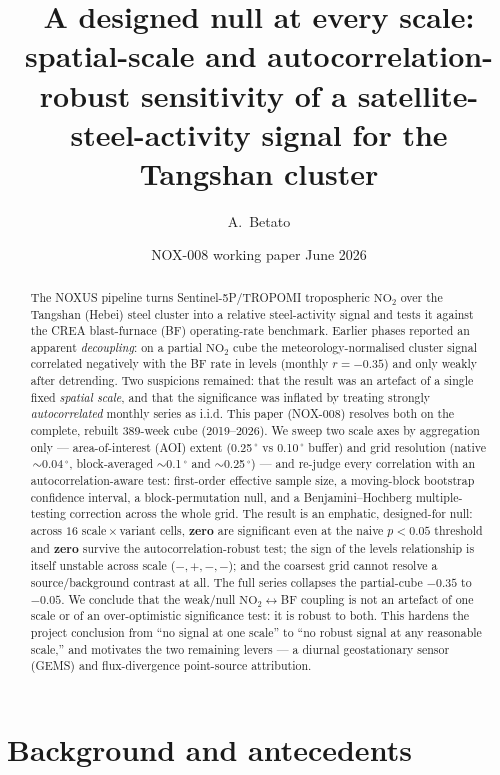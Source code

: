 \documentclass[11pt,a4paper]{article}
\title{\bfseries A designed null at every scale: spatial-scale and
autocorrelation-robust sensitivity of a satellite-\ce{NO_2} steel-activity signal
for the Tangshan cluster}
\author[1]{A.~Betato}
\affil[1]{NOXUS project --- \texttt{abetatos@gmail.com}}
\date{NOX-008 working paper \quad\textbullet\quad 14 June 2026}
\providecommand{\degree}{\ensuremath{^{\circ}}}
\newcommand{\SI}[2]{#1\,#2}
\newcommand{\rval}[1]{\mbox{$r=#1$}}
\providecommand{\ce}[1]{\ensuremath{\mathrm{#1}}}
\begin{document}
\maketitle

\begin{abstract}
\noindent
The NOXUS pipeline turns Sentinel-5P/TROPOMI tropospheric \ce{NO_2} over the Tangshan
(Hebei) steel cluster into a relative steel-activity signal and tests it against the
CREA blast-furnace (BF) operating-rate benchmark. Earlier phases reported an apparent
\emph{decoupling}: on a partial \ce{NO_2} cube the meteorology-normalised cluster signal
correlated negatively with the BF rate in levels (monthly \rval{-0.35}) and only weakly
after detrending. Two suspicions remained: that the result was an artefact of a single
fixed \emph{spatial scale}, and that the significance was inflated by treating strongly
\emph{autocorrelated} monthly series as i.i.d. This paper (NOX-008) resolves both on the
complete, rebuilt 389-week cube (2019--2026). We sweep two scale axes by aggregation
only --- area-of-interest (AOI) extent (\SI{0.25}{\degree} vs \SI{0.10}{\degree} buffer)
and grid resolution (native \,$\sim$\SI{0.04}{\degree}, block-averaged $\sim$\SI{0.1}{\degree}
and $\sim$\SI{0.25}{\degree}) --- and re-judge every correlation with an
autocorrelation-aware test: first-order effective sample size, a moving-block bootstrap
confidence interval, a block-permutation null, and a Benjamini--Hochberg
multiple-testing correction across the whole grid. The result is an emphatic, designed-for
null: across $16$ scale\,$\times$\,variant cells, \textbf{zero} are significant even at the
naive $p<0.05$ threshold and \textbf{zero} survive the autocorrelation-robust test; the
sign of the levels relationship is itself unstable across scale ($-,+,-,-$); and the
coarsest grid cannot resolve a source/background contrast at all. The full series collapses
the partial-cube $-0.35$ to $-0.05$. We conclude that the weak/null \ce{NO_2}$\leftrightarrow$BF
coupling is not an artefact of one scale or of an over-optimistic significance test: it is
robust to both. This hardens the project conclusion from ``no signal at one scale'' to
``no robust signal at any reasonable scale,'' and motivates the two remaining levers ---
a diurnal geostationary sensor (GEMS) and flux-divergence point-source attribution.
\end{abstract}

\section{Background and antecedents}
\label{sec:background}
\end{document}
